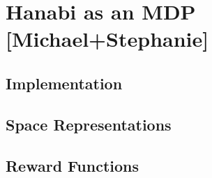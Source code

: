\section{Hanabi as an MDP [Michael+Stephanie]}\label{sec:hanabimdp}


\subsection{Implementation}

\subsection{Space Representations}

\subsection{Reward Functions}

